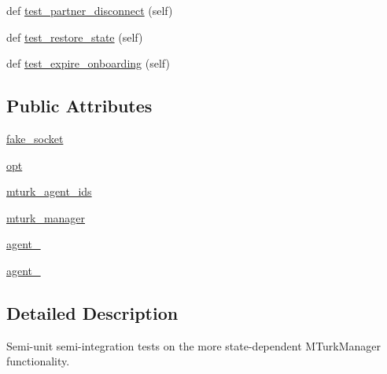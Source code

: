 \begin{DoxyCompactItemize}
\item 
def \hyperlink{classparlai_1_1mturk_1_1core_1_1legacy__2018_1_1test_1_1test__mturk__manager_1_1TestMTurkManagerConnectedFunctions_a6c780a05e1a71e8e173ad8b7a76082ae}{test\+\_\+partner\+\_\+disconnect} (self)
\item 
def \hyperlink{classparlai_1_1mturk_1_1core_1_1legacy__2018_1_1test_1_1test__mturk__manager_1_1TestMTurkManagerConnectedFunctions_a7966fef8eeb04818945b5f39a81f1f3c}{test\+\_\+restore\+\_\+state} (self)
\item 
def \hyperlink{classparlai_1_1mturk_1_1core_1_1legacy__2018_1_1test_1_1test__mturk__manager_1_1TestMTurkManagerConnectedFunctions_a9ddb561032391b12e01e677412abdd38}{test\+\_\+expire\+\_\+onboarding} (self)
\end{DoxyCompactItemize}
\subsection*{Public Attributes}
\begin{DoxyCompactItemize}
\item 
\hyperlink{classparlai_1_1mturk_1_1core_1_1legacy__2018_1_1test_1_1test__mturk__manager_1_1TestMTurkManagerConnectedFunctions_a450ad727b1c1f818041bedb2b0d75a24}{fake\+\_\+socket}
\item 
\hyperlink{classparlai_1_1mturk_1_1core_1_1legacy__2018_1_1test_1_1test__mturk__manager_1_1TestMTurkManagerConnectedFunctions_a90cf82a5bc90487db1d389917e6cacf8}{opt}
\item 
\hyperlink{classparlai_1_1mturk_1_1core_1_1legacy__2018_1_1test_1_1test__mturk__manager_1_1TestMTurkManagerConnectedFunctions_aac66d456241604aab2032640c246cd3e}{mturk\+\_\+agent\+\_\+ids}
\item 
\hyperlink{classparlai_1_1mturk_1_1core_1_1legacy__2018_1_1test_1_1test__mturk__manager_1_1TestMTurkManagerConnectedFunctions_aa60785635f35c19008a7fd9e9956dd39}{mturk\+\_\+manager}
\item 
\hyperlink{classparlai_1_1mturk_1_1core_1_1legacy__2018_1_1test_1_1test__mturk__manager_1_1TestMTurkManagerConnectedFunctions_a2145d16b2683c5bfe190cafd80906f80}{agent\+\_}
\item 
\hyperlink{classparlai_1_1mturk_1_1core_1_1legacy__2018_1_1test_1_1test__mturk__manager_1_1TestMTurkManagerConnectedFunctions_aca23b65aae92e1850211e9c38e2f1279}{agent\+\_}
\end{DoxyCompactItemize}


\subsection{Detailed Description}
\begin{DoxyVerb}Semi-unit semi-integration tests on the more state-dependent MTurkManager
functionality.
\end{DoxyVerb}
 

